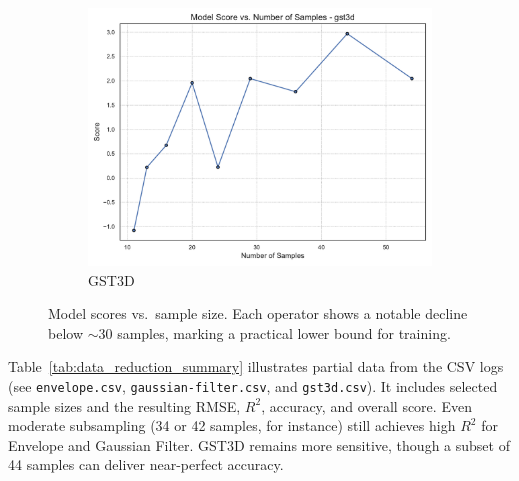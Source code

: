 \begin{figure}[htbp]
\begin{subfigure}[t]{0.32\textwidth}
        \includegraphics[width=\textwidth]{assets/images/05/score_by_sample_size_gst3d}
        \caption{\ac{GST3D}}
    \end{subfigure}
    \caption{Model scores vs.\ sample size.
    Each operator shows a notable decline below \(\sim\)30 samples, marking a practical lower bound for training.}
    \label{fig:score_by_sample_size_operators}
\end{figure}

Table~\ref{tab:data_reduction_summary} illustrates partial data from the CSV logs (see \texttt{envelope.csv}, \texttt{gaussian-filter.csv}, and \texttt{gst3d.csv}). 
It includes selected sample sizes and the resulting \ac{RMSE}, $R^2$, accuracy, and overall score.
Even moderate subsampling (34 or 42 samples, for instance) still achieves high $R^2$ for Envelope and Gaussian Filter.
\ac{GST3D} remains more sensitive, though a subset of 44 samples can deliver near-perfect accuracy.

